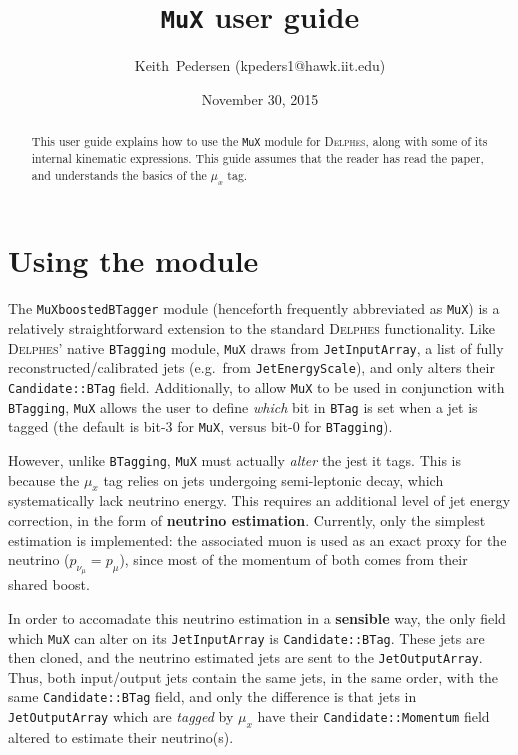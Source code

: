 \documentclass{article}
\newcommand{\muX}{$\mu_{x}^{}$}
\newcommand{\muXmodFull}{\texttt{MuXboostedBTagger}}
\newcommand{\muXmod}{\texttt{MuX}}
\newcommand{\delphes}{\textsc{Delphes}}
\newcommand{\pMu}[1][]     {p_{\mu}^{#1}}
\newcommand{\pNu}[1][]     {p_{\nu_{\mu}}^{#1}}
\begin{document}
\title{{\muXmod} user guide}

\author{Keith~Pedersen (kpeders1@hawk.iit.edu)}

\date{November 30, 2015}

\maketitle

\begin{abstract}
This user guide explains how to use the {\muXmod} module for {\delphes}, along with 
some of its internal kinematic expressions. This guide assumes that the reader has
read the paper, and understands the basics of the {\muX} tag.
\end{abstract}

\section{Using the module}
The {\muXmodFull} module (henceforth frequently abbreviated as {\muXmod})
is a relatively straightforward extension to the standard {\delphes}
functionality. Like {\delphes}' native \texttt{BTagging} module, {\muXmod}
draws from \texttt{JetInputArray}, a list of fully reconstructed/calibrated
jets (e.g.\ from \texttt{JetEnergyScale}), and only alters their
\texttt{Candidate::BTag} field. Additionally, to allow {\muXmod} to be used in
conjunction with \texttt{BTagging}, {\muXmod} allows the user to define
\emph{which} bit in \texttt{BTag} is set when a jet is tagged (the default is
bit-3 for {\muXmod}, versus bit-0 for \texttt{BTagging}).

However, unlike \texttt{BTagging},
{\muXmod} must actually \emph{alter} the jest it tags. This is because the
{\muX} tag relies on jets undergoing semi-leptonic decay, which systematically
lack neutrino energy. This requires an additional level of jet energy
correction, in the form of \textbf{neutrino estimation}. Currently, only the
simplest estimation is implemented: the associated muon is used as an exact
proxy for the neutrino ($\pNu=\pMu$), since most of the momentum of both comes
from their shared boost.

In order to accomadate this neutrino estimation in a \textbf{sensible} way, the
only field which {\muXmod} can alter on its \texttt{JetInputArray} is \linebreak
\texttt{Candidate::BTag}. These jets are then cloned, and the neutrino
estimated jets are sent to the \texttt{JetOutputArray}. Thus, both input/output
jets contain the same jets, in the same order, with the same
\texttt{Candidate::BTag} field, and only the difference is that
jets in \texttt{JetOutputArray} which are \emph{tagged} by {\muX} have their
\texttt{Candidate::Momentum} field altered to estimate their neutrino(s).
\end{document}
